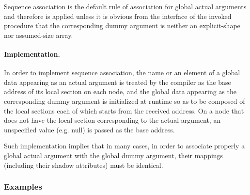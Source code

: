 Sequence association is the default rule of association for global
actual arguments and therefore is applied unless it is obvious from the
interface of the invoked procedure that the corresponding dummy argument
is neither an explicit-shape nor assumed-size array.


\paragraph{Implementation.}

In order to implement sequence association, the name or an element
of a global data appearing as an actual argument is treated by the
{\XMP} compiler as the base address of its local section on each node,
and the global data appearing as the corresponding dummy argument is
initialized at runtime so as to be composed of the local sections each
of which starts from the received address.
%
On a node that does not have the local section corresponding to the
actual argument, an unspecified value (e.g. null) is passed as the base
address.

Such implementation implies that in many cases, in order to associate
properly a global actual argument with the global dummy argument, their
mappings (including their shadow attributes) must be identical.


\subsubsection*{Examples}

